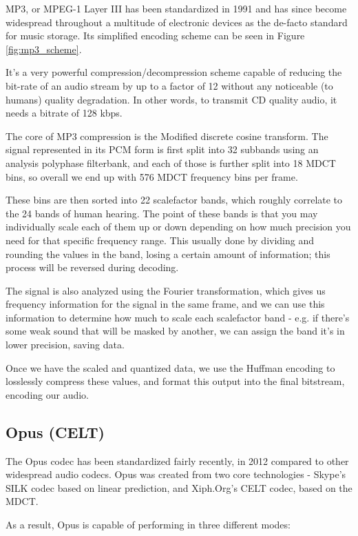 MP3, or MPEG-1 Layer III has been standardized in 1991 and has since become widespread throughout a multitude of electronic devices as the de-facto standard for music storage. Its simplified encoding scheme can be seen in Figure \ref{fig:mp3_scheme}.

It's a very powerful compression/decompression scheme capable of reducing the bit-rate of an audio stream by up to a factor of 12 without any noticeable (to humans) quality degradation. In other words, to transmit CD quality audio, it needs a bitrate of 128 kbps. \cite{Raissi2002TheTB}

The core of MP3 compression is the Modified discrete cosine transform. The signal represented in its PCM form is first split into 32 subbands using an analysis polyphase filterbank, and each of those is further split into 18 MDCT bins, so overall we end up with 576 MDCT frequency bins per frame.

These bins are then sorted into 22 scalefactor bands, which roughly correlate to the 24 bands of human hearing. The point of these bands is that you may individually scale each of them up or down depending on how much precision you need for that specific frequency range. This usually done by dividing and rounding the values in the band, losing a certain amount of information; this process will be reversed during decoding.

The signal is also analyzed using the Fourier transformation, which gives us frequency information for the signal in the same frame, and we can use this information to determine how much to scale each scalefactor band - e.g. if there's some weak sound that will be masked by another, we can assign the band it's in lower precision, saving data. \cite{wilburn_2007}

Once we have the scaled and quantized data, we use the Huffman encoding to losslessly compress these values, and format this output into the final bitstream, encoding our audio.

\subsection{Opus (CELT)}
The Opus codec has been standardized fairly recently, in 2012 \cite{rfc6716} compared to other widespread audio codecs. Opus was created from two core technologies - Skype's SILK codec based on linear prediction, and Xiph.Org's CELT codec, based on the MDCT. \cite{opus_celt}

As a result, Opus is capable of performing in three different modes:

